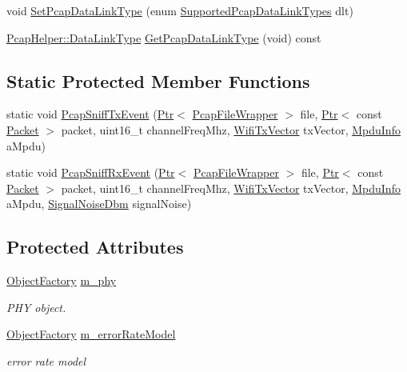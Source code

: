 \begin{DoxyCompactItemize}
\item 
void \hyperlink{classns3_1_1WifiPhyHelper_ae4b90e90f6e78a19c1b7fdf08b270218}{Set\+Pcap\+Data\+Link\+Type} (enum \hyperlink{classns3_1_1WifiPhyHelper_ab5b7fd179ec894742ac15f6751d68fc1}{Supported\+Pcap\+Data\+Link\+Types} dlt)
\item 
\hyperlink{classns3_1_1PcapHelper_a2ee4dad28ddd9a1fe636f51835eaa77f}{Pcap\+Helper\+::\+Data\+Link\+Type} \hyperlink{classns3_1_1WifiPhyHelper_a1ac7d21ac3f931ccd18a31fa72e57dc2}{Get\+Pcap\+Data\+Link\+Type} (void) const 
\end{DoxyCompactItemize}
\subsection*{Static Protected Member Functions}
\begin{DoxyCompactItemize}
\item 
static void \hyperlink{classns3_1_1WifiPhyHelper_a24e075fa55e473c81f76a4178c0fcb25}{Pcap\+Sniff\+Tx\+Event} (\hyperlink{classns3_1_1Ptr}{Ptr}$<$ \hyperlink{classns3_1_1PcapFileWrapper}{Pcap\+File\+Wrapper} $>$ file, \hyperlink{classns3_1_1Ptr}{Ptr}$<$ const \hyperlink{classns3_1_1Packet}{Packet} $>$ packet, uint16\+\_\+t channel\+Freq\+Mhz, \hyperlink{classns3_1_1WifiTxVector}{Wifi\+Tx\+Vector} tx\+Vector, \hyperlink{structns3_1_1MpduInfo}{Mpdu\+Info} a\+Mpdu)
\item 
static void \hyperlink{classns3_1_1WifiPhyHelper_ac5da2b1210868b0ae050e3adc54a9d2f}{Pcap\+Sniff\+Rx\+Event} (\hyperlink{classns3_1_1Ptr}{Ptr}$<$ \hyperlink{classns3_1_1PcapFileWrapper}{Pcap\+File\+Wrapper} $>$ file, \hyperlink{classns3_1_1Ptr}{Ptr}$<$ const \hyperlink{classns3_1_1Packet}{Packet} $>$ packet, uint16\+\_\+t channel\+Freq\+Mhz, \hyperlink{classns3_1_1WifiTxVector}{Wifi\+Tx\+Vector} tx\+Vector, \hyperlink{structns3_1_1MpduInfo}{Mpdu\+Info} a\+Mpdu, \hyperlink{structns3_1_1SignalNoiseDbm}{Signal\+Noise\+Dbm} signal\+Noise)
\end{DoxyCompactItemize}
\subsection*{Protected Attributes}
\begin{DoxyCompactItemize}
\item 
\hyperlink{classns3_1_1ObjectFactory}{Object\+Factory} \hyperlink{classns3_1_1WifiPhyHelper_ae3b07648ffcc4ad9bd82087c826aaf1b}{m\+\_\+phy}
\begin{DoxyCompactList}\small\item\em P\+HY object. \end{DoxyCompactList}\item 
\hyperlink{classns3_1_1ObjectFactory}{Object\+Factory} \hyperlink{classns3_1_1WifiPhyHelper_a7c698249ec8cee27e1ad1f175ce300fd}{m\+\_\+error\+Rate\+Model}
\begin{DoxyCompactList}\small\item\em error rate model \end{DoxyCompactList}\end{DoxyCompactItemize}
